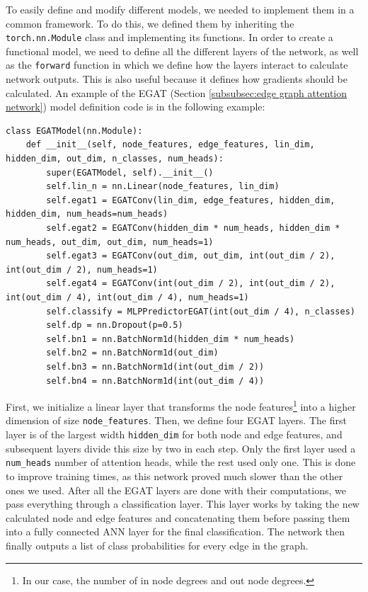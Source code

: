 \documentclass[times, utf8, diplomski, english]{fer_eng}
\begin{document}
To easily define and modify different models, we needed to implement them in a common framework. To do this, we defined them by inheriting the \texttt{torch.nn.Module} class and implementing its functions. In order to create a functional model, we need to define all the different layers of the network, as well as the \texttt{forward} function in which we define how the layers interact to calculate network outputs. This is also useful because it defines how gradients should be calculated. An example of the EGAT (Section \ref{subsubsec:edge graph attention network}) model definition code is in the following example:
\begin{lstlisting}
class EGATModel(nn.Module):
	def __init__(self, node_features, edge_features, lin_dim, hidden_dim, out_dim, n_classes, num_heads):
		super(EGATModel, self).__init__()
		self.lin_n = nn.Linear(node_features, lin_dim)
		self.egat1 = EGATConv(lin_dim, edge_features, hidden_dim, hidden_dim, num_heads=num_heads)
		self.egat2 = EGATConv(hidden_dim * num_heads, hidden_dim * num_heads, out_dim, out_dim, num_heads=1)
		self.egat3 = EGATConv(out_dim, out_dim, int(out_dim / 2), int(out_dim / 2), num_heads=1)
		self.egat4 = EGATConv(int(out_dim / 2), int(out_dim / 2), int(out_dim / 4), int(out_dim / 4), num_heads=1)
		self.classify = MLPPredictorEGAT(int(out_dim / 4), n_classes)
		self.dp = nn.Dropout(p=0.5)
		self.bn1 = nn.BatchNorm1d(hidden_dim * num_heads)
		self.bn2 = nn.BatchNorm1d(out_dim)
		self.bn3 = nn.BatchNorm1d(int(out_dim / 2))
		self.bn4 = nn.BatchNorm1d(int(out_dim / 4))
\end{lstlisting}
First, we initialize a linear layer that transforms the node features\footnote{In our case, the number of in node degrees and out node degrees.} into a higher dimension of size \texttt{node\_features}. Then, we define four EGAT layers. The first layer is of the largest width \texttt{hidden\_dim} for both node and edge features, and subsequent layers divide this size by two in each step. Only the first layer used a \texttt{num\_heads} number of attention heads, while the rest used only one. This is done to improve training times, as this network proved much slower than the other ones we used. After all the EGAT layers are done with their computations, we pass everything through a classification layer. This layer works by taking the new calculated node and edge features and concatenating them before passing them into a fully connected ANN layer for the final classification. The network then finally outputs a list of class probabilities for every edge in the graph.
\end{document}
